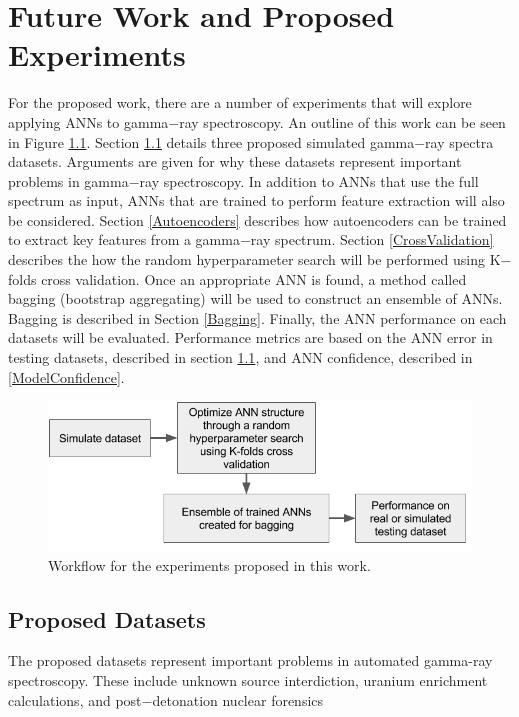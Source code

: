 \documentclass[tocnosub,noragright,centerchapter,12pt,fullpage]{uiucecethesis09}
\begin{document}
\chapter{Future Work and Proposed Experiments}

For the proposed work, there are a number of experiments that will explore applying ANNs to gamma$-$ray spectroscopy. An outline of this work can be seen in Figure \ref{fig:ANN_workflow}. Section \ref{ProposedDatasets} details three proposed simulated gamma$-$ray spectra datasets. Arguments are given for why these datasets represent important problems in gamma$-$ray spectroscopy. In addition to ANNs that use the full spectrum as input, ANNs that are trained to perform feature extraction will also be considered. Section \ref{Autoencoders} describes how autoencoders can be trained to extract key features from a gamma$-$ray spectrum. Section \ref{CrossValidation} describes the how the random hyperparameter search will be performed using K$-$folds cross validation. Once an appropriate ANN is found, a method called bagging (bootstrap aggregating) will be used to construct an ensemble of ANNs. Bagging is described in Section \ref{Bagging}. Finally, the ANN performance on each datasets will be evaluated. Performance metrics are based on the ANN error in testing datasets, described in section \ref{ProposedDatasets}, and ANN confidence, described in \ref{ModelConfidence}. 




\begin{figure}[H]
\centering
\includegraphics[width=0.8\linewidth]{images/ANN_workflow}
\caption{Workflow for the experiments proposed in this work.}
\label{fig:ANN_workflow}
\end{figure}



\section{Proposed Datasets} \label{ProposedDatasets}

The proposed datasets represent important problems in automated gamma-ray spectroscopy. These include unknown source interdiction, uranium enrichment calculations, and post$-$detonation nuclear forensics 
\end{document}
